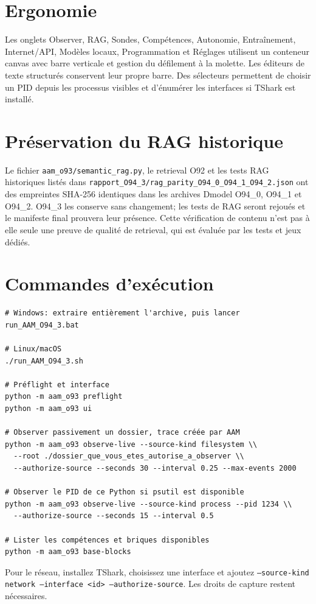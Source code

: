 \documentclass[11pt,a4paper]{article}
\begin{document}
\section{Ergonomie}
Les onglets Observer, RAG, Sondes, Compétences, Autonomie, Entraînement, Internet/API, Modèles locaux, Programmation et Réglages utilisent un conteneur canvas avec barre verticale et gestion du défilement à la molette. Les éditeurs de texte structurés conservent leur propre barre. Des sélecteurs permettent de choisir un PID depuis les processus visibles et d'énumérer les interfaces si TShark est installé.

\section{Préservation du RAG historique}
Le fichier \texttt{aam\_o93/semantic\_rag.py}, le retrieval O92 et les tests RAG historiques listés dans \texttt{rapport\_O94\_3/rag\_parity\_O94\_0\_O94\_1\_O94\_2.json} ont des empreintes SHA-256 identiques dans les archives Dmodel O94\_0, O94\_1 et O94\_2. O94\_3 les conserve sans changement; les tests de RAG seront rejoués et le manifeste final prouvera leur présence. Cette vérification de contenu n'est pas à elle seule une preuve de qualité de retrieval, qui est évaluée par les tests et jeux dédiés.

\section{Commandes d'exécution}
\begin{verbatim}
# Windows: extraire entièrement l'archive, puis lancer
run_AAM_O94_3.bat

# Linux/macOS
./run_AAM_O94_3.sh

# Préflight et interface
python -m aam_o93 preflight
python -m aam_o93 ui

# Observer passivement un dossier, trace créée par AAM
python -m aam_o93 observe-live --source-kind filesystem \\
  --root ./dossier_que_vous_etes_autorise_a_observer \\
  --authorize-source --seconds 30 --interval 0.25 --max-events 2000

# Observer le PID de ce Python si psutil est disponible
python -m aam_o93 observe-live --source-kind process --pid 1234 \\
  --authorize-source --seconds 15 --interval 0.5

# Lister les compétences et briques disponibles
python -m aam_o93 base-blocks
\end{verbatim}
Pour le réseau, installez TShark, choisissez une interface et ajoutez \texttt{--source-kind network --interface <id> --authorize-source}. Les droits de capture restent nécessaires.
\end{document}
